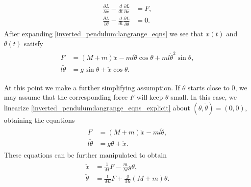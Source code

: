 \begin{align}
	\begin{split}
\frac{\partial L}{\partial x} - \frac{d}{dt} \frac{\partial L}{\partial \dot{x}} &= F,\\
\frac{\partial L}{\partial \theta} - \frac{d}{dt} \frac{\partial L}{\partial \dot{\theta}} &= 0.
	\end{split}\label{inverted_pendulum:langrange_eqns}
\end{align}
After expanding \eqref{inverted_pendulum:langrange_eqns} we see that $x(t)$ and $\theta(t)$ satisfy
\begin{align}
	\begin{split}
		F &= (M + m)\ddot{x} - ml\ddot{\theta} \cos \theta + ml \dot{\theta}^2 \sin \theta,\\
		l \ddot{\theta} &= g \sin \theta + \ddot{x} \cos \theta.
	\end{split}\label{inverted_pendulum:langrange_eqns_explicit}
\end{align}

At this point we make a further simplifying assumption. 
If $\theta$ starts close to $0$, we may assume that the corresponding force $F$ will keep $\theta$ small. 
In this case, we linearize \eqref{inverted_pendulum:langrange_eqns_explicit} about $(\theta, \dot{\theta}) = (0,0)$, obtaining the equations 
\begin{align*}
	\begin{split}
		F &= (M + m)\ddot{x} - ml\ddot{\theta},\\
		l \ddot{\theta} &= g \theta + \ddot{x}.
	\end{split}%
\end{align*}
These equations can be further manipulated 
to obtain 
\begin{align}
	\begin{split}
		\ddot{x} &= \frac{1}{M}F - \frac{m}{M}g\theta,\\
		\ddot{\theta} &= \frac{1}{Ml}F + \frac{g}{Ml} (M+m) \theta.
	\end{split}\label{inverted_pendulum:langrange_eqns_explicit3}
\end{align}

